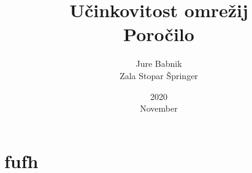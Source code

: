 \documentclass[a4paper, 16pt]{article}
\title{%
    Učinkovitost omrežij \\ 
    \large Poročilo}
\date{2020\\ November}
\author{Jure Babnik \\  Zala Stopar Špringer}
\begin{document}
\maketitle

\newpage

\section{fufh}
\end{document}
